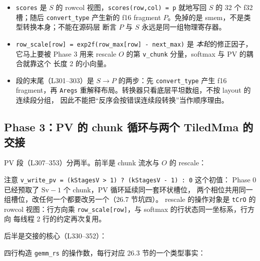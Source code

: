 \begin{itemize}[itemsep=2pt,topsep=2pt]
  \item \texttt{scores} 是 \(S\) 的 rowcol 视图，\texttt{scores\allowbreak{}(row,\allowbreak{}col) =\allowbreak{} p}
        就地写回 $S$ 的 32 个 f32 槽；随后 \texttt{convert\_\allowbreak{}type} 产生新的
        f16 fragment $P$。免掉的是 smem，不是类型转换本身；不能在源码层
        断言 $P$ 与 $S$ 永远是同一组物理寄存器。
  \item \texttt{row\_\allowbreak{}scale[row] =\allowbreak{} exp2f\allowbreak{}(row\_\allowbreak{}max[row] - next\_\allowbreak{}max)} 是
        \emph{本轮}的修正因子，它马上要被 Phase 3 用来 rescale
        $O$ 的第 \texttt{v\_chunk} 分量，softmax 与 PV 的耦合就靠这个
        长度 2 的小向量。
  \item 段的末尾（L301--303）是 $S \to P$ 的两步：先
        \texttt{convert\_\allowbreak{}type} 产生 f16 fragment，再 \texttt{Aregs}
        重解释布局。转换器只看底层平坦数组，不按 layout 的连续段分组，
        因此不能把“反序会按错误连续段转换”当作顺序理由。
\end{itemize}

\subsection{Phase 3：PV 的 chunk 循环与两个 TiledMma 的交接}

PV 段（L307--353）分两半。前半是 chunk 流水与 $O$ 的 rescale：



注意 \texttt{v\_write\_pv = (kStagesV > 1) ? (kStagesV - 1) : 0} 这个初值：
Phase 0 已经预取了 $\mathrm{Sv}-1$ 个 chunk，PV 循环延续同一套环状槽位，
两个相位共用同一组槽位，改任何一个都要改另一个（26.7 节坑四）。
rescale 的操作对象是 \texttt{tCrO} 的 rowcol 视图：行方向乘
\texttt{row\_\allowbreak{}scale[row]}，与 softmax 的行状态同一坐标系，行方向
每线程 2 行的约定再次复用。

后半是交接的核心（L330--352）：



四行构造 \texttt{gemm\_rs} 的操作数，每行对应 26.3 节的一个类型事实：

